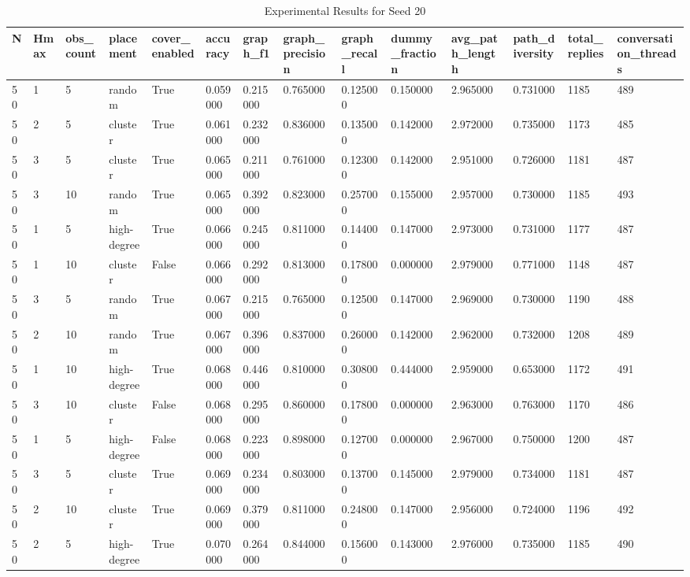 \begin{table}
\caption{Experimental Results for Seed 20}
\label{tab:results_seed_20}
\begin{tabular}{llllllllllllll}
\toprule
N & Hmax & obs_count & placement & cover_enabled & accuracy & graph_f1 & graph_precision & graph_recall & dummy_fraction & avg_path_length & path_diversity & total_replies & conversation_threads \\
\midrule
50 & 1 & 5 & random & True & 0.059000 & 0.215000 & 0.765000 & 0.125000 & 0.150000 & 2.965000 & 0.731000 & 1185 & 489 \\
50 & 2 & 5 & cluster & True & 0.061000 & 0.232000 & 0.836000 & 0.135000 & 0.142000 & 2.972000 & 0.735000 & 1173 & 485 \\
50 & 3 & 5 & cluster & True & 0.065000 & 0.211000 & 0.761000 & 0.123000 & 0.142000 & 2.951000 & 0.726000 & 1181 & 487 \\
50 & 3 & 10 & random & True & 0.065000 & 0.392000 & 0.823000 & 0.257000 & 0.155000 & 2.957000 & 0.730000 & 1185 & 493 \\
50 & 1 & 5 & high-degree & True & 0.066000 & 0.245000 & 0.811000 & 0.144000 & 0.147000 & 2.973000 & 0.731000 & 1177 & 487 \\
50 & 1 & 10 & cluster & False & 0.066000 & 0.292000 & 0.813000 & 0.178000 & 0.000000 & 2.979000 & 0.771000 & 1148 & 487 \\
50 & 3 & 5 & random & True & 0.067000 & 0.215000 & 0.765000 & 0.125000 & 0.147000 & 2.969000 & 0.730000 & 1190 & 488 \\
50 & 2 & 10 & random & True & 0.067000 & 0.396000 & 0.837000 & 0.260000 & 0.142000 & 2.962000 & 0.732000 & 1208 & 489 \\
50 & 1 & 10 & high-degree & True & 0.068000 & 0.446000 & 0.810000 & 0.308000 & 0.444000 & 2.959000 & 0.653000 & 1172 & 491 \\
50 & 3 & 10 & cluster & False & 0.068000 & 0.295000 & 0.860000 & 0.178000 & 0.000000 & 2.963000 & 0.763000 & 1170 & 486 \\
50 & 1 & 5 & high-degree & False & 0.068000 & 0.223000 & 0.898000 & 0.127000 & 0.000000 & 2.967000 & 0.750000 & 1200 & 487 \\
50 & 3 & 5 & cluster & True & 0.069000 & 0.234000 & 0.803000 & 0.137000 & 0.145000 & 2.979000 & 0.734000 & 1181 & 487 \\
50 & 2 & 10 & cluster & True & 0.069000 & 0.379000 & 0.811000 & 0.248000 & 0.147000 & 2.956000 & 0.724000 & 1196 & 492 \\
50 & 2 & 5 & high-degree & True & 0.070000 & 0.264000 & 0.844000 & 0.156000 & 0.143000 & 2.976000 & 0.735000 & 1185 & 490 \\

\end{tabular}
\end{table}
